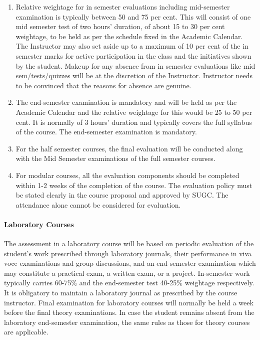 \begin{enumerate}[leftmargin=15mm]
    \item Relative weightage for in semester evaluations including mid-semester examination is typically between 50 and 75 per cent. This will consist of one mid semester test of two hours’ duration, of about 15 to 30 per cent weightage, to be held as per the schedule fixed in the Academic Calendar. The Instructor may also set aside up to a maximum of 10 per cent of the in semester marks for active participation in the class and the initiatives shown by the student. Makeup for any absence from in semester evaluations like mid sem/tests/quizzes will be at the discretion of the Instructor. Instructor needs to be convinced that the reasons for absence are genuine. 
    \item The end-semester examination is mandatory and will be held as per the Academic Calendar and the relative weightage for this would be 25 to 50 per cent. It is normally of 3 hours’ duration and typically covers the full syllabus of the course. The end-semester examination is mandatory. 
    \item For the half semester courses, the final evaluation will be conducted along with the Mid Semester examinations of the full semester courses.
    \item For modular courses, all the evaluation components should be completed within 1-2 weeks of the completion of the course. The evaluation policy must be stated clearly in the course proposal and approved by SUGC. The attendance alone cannot be considered for evaluation.
\end{enumerate}

\paragraph{Laboratory Courses} The assessment in a laboratory course will be based on periodic evaluation of the student’s work prescribed through laboratory journals, their performance in viva voce examinations and group discussions, and an end-semester examination which may constitute a practical exam, a written exam, or a project. In-semester work typically carries 60-75\% and the end-semester test 40-25\% weightage respectively. It is obligatory to maintain a laboratory journal as prescribed by the course instructor. Final examination for laboratory courses will normally be held a week before the final theory examinations. In case the student remains absent from the laboratory end-semester examination, the same rules as those for theory courses are applicable.

